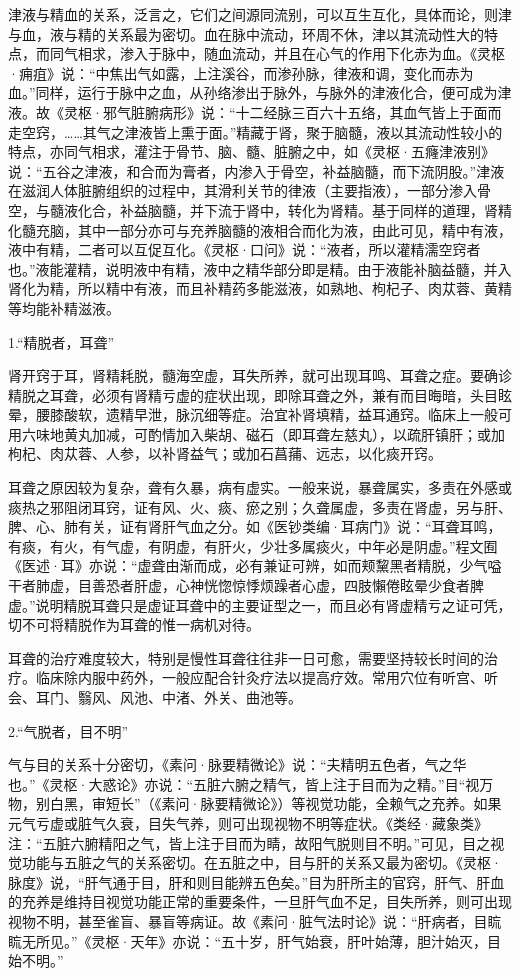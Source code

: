 \documentclass[12pt]{ctexbook}
\begin{document}
津液与精血的关系，泛言之，它们之间源同流别，可以互生互化，具体而论，则津与血，液与精的关系最为密切。血在脉中流动，环周不休，津以其流动性大的特点，而同气相求，渗入于脉中，随血流动，并且在心气的作用下化赤为血。《灵枢·痈疽》说：“中焦出气如露，上注溪谷，而渗孙脉，律液和调，变化而赤为血。”同样，运行于脉中之血，从孙络渗出于脉外，与脉外的津液化合，便可成为津液。故《灵枢·邪气脏腑病形》说：“十二经脉三百六十五络，其血气皆上于面而走空窍，……其气之津液皆上熏于面。”精藏于肾，聚于脑髓，液以其流动性较小的特点，亦同气相求，灌注于骨节、脑、髓、脏腑之中，如《灵枢·五癃津液别》说：“五谷之津液，和合而为膏者，内渗入于骨空，补益脑髓，而下流阴股。”津液在滋润人体脏腑组织的过程中，其滑利关节的律液（主要指液），一部分渗入骨空，与髓液化合，补益脑髓，并下流于肾中，转化为肾精。基于同样的道理，肾精化髓充脑，其中一部分亦可与充养脑髓的液相合而化为液，由此可见，精中有液，液中有精，二者可以互促互化。《灵枢·口问》说：“液者，所以灌精濡空窍者也。”液能灌精，说明液中有精，液中之精华部分即是精。由于液能补脑益髓，并入肾化为精，所以精中有液，而且补精药多能滋液，如熟地、枸杞子、肉苁蓉、黄精等均能补精滋液。


1.“精脱者，耳聋”

肾开窍于耳，肾精耗脱，髓海空虚，耳失所养，就可出现耳鸣、耳聋之症。要确诊精脱之耳聋，必须有肾精亏虚的症状出现，即除耳聋之外，兼有而目晦暗，头目眩晕，腰膝酸软，遗精早泄，脉沉细等症。治宜补肾填精，益耳通窍。临床上一般可用六味地黄丸加减，可酌情加入柴胡、磁石（即耳聋左慈丸），以疏肝镇肝；或加枸杞、肉苁蓉、人参，以补肾益气；或加石菖蒱、远志，以化痰开窍。

耳聋之原因较为复杂，聋有久暴，病有虚实。一般来说，暴聋属实，多责在外感或痰热之邪阻闭耳窍，证有风、火、痰、瘀之别；久聋属虚，多责在肾虚，另与肝、脾、心、肺有关，证有肾肝气血之分。如《医钞类编·耳病门》说：“耳聋耳鸣，有痰，有火，有气虚，有阴虚，有肝火，少壮多属痰火，中年必是阴虚。”程文囿《医述·耳》亦说：“虚聋由渐而成，必有兼证可辨，如而颊黧黑者精脱，少气嗌干者肺虚，目善恐者肝虚，心神恍惚惊悸烦躁者心虚，四肢懶倦眩晕少食者脾虚。”说明精脱耳聋只是虚证耳聋中的主要证型之一，而且必有肾虚精亏之证可凭，切不可将精脱作为耳聋的惟一病机对待。

耳聋的治疗难度较大，特别是慢性耳聋往往非一日可愈，需要坚持较长时间的治疗。临床除内服中药外，一般应配合针灸疗法以提高疗效。常用穴位有听宫、听会、耳门、翳风、风池、中渚、外关、曲池等。

2.“气脱者，目不明”

气与目的关系十分密切，《素问·脉要精微论》说：“夫精明五色者，气之华也。”《灵枢·大惑论》亦说：“五脏六腑之精气，皆上注于目而为之精。”目“视万物，别白黑，审短长”（《素问·脉要精微论》）等视觉功能，全赖气之充养。如果元气亏虚或脏气久衰，目失气养，则可出现视物不明等症状。《类经·藏象类》注：“五脏六腑精阳之气，皆上注于目而为睛，故阳气脱则目不明。”可见，目之视觉功能与五脏之气的关系密切。在五脏之中，目与肝的关系又最为密切。《灵枢·脉度》说，“肝气通于目，肝和则目能辨五色矣。”目为肝所主的官窍，肝气、肝血的充养是维持目视觉功能正常的重要条件，一旦肝气血不足，目失所养，则可出现视物不明，甚至雀盲、暴盲等病证。故《素问·脏气法时论》说：“肝病者，目䀮䀮无所见。”《灵枢·天年》亦说：“五十岁，肝气始衰，肝叶始薄，胆汁始灭，目始不明。”
\end{document}
